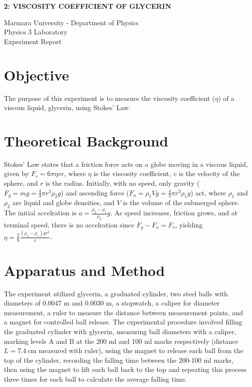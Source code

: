 \documentclass[12pt, a4paper]{article}
\begin{document}
\begin{center}
	\Large \textbf{2: VISCOSITY COEFFICIENT OF GLYCERIN}
	\vspace{0.5cm}
	    
	\normalsize Marmara University - Department of Physics \\
	Physics 3 Laboratory \\
	Experiment Report
	\vspace{0.5cm}
\end{center}

\section{Objective}
The purpose of this experiment is to measure the viscosity coefficient ($\eta$) of a viscous liquid, glycerin, using Stokes' Law.

\section{Theoretical Background}
Stokes' Law states that a friction force acts on a globe moving in a viscous liquid, given by $F_v = 6\pi\eta vr$, where $\eta$ is the viscosity coefficient, $v$ is the velocity of the sphere, and $r$ is the radius. Initially, with no speed, only gravity ($F_g = mg = \frac{4}{3}\pi r^3 \rho_2 g$) and ascending force ($F_a = \rho_1 V g = \frac{4}{3}\pi r^3 \rho_1 g$) act, where $\rho_1$ and $\rho_2$ are liquid and globe densities, and $V$ is the volume of the submerged sphere. The initial accelration is $a = \frac{\rho_2 - \rho_1}{\rho_2}g$. As speed increases, friction grows, and at terminal speed, there is no accelration since $F_g - F_a = F_v$, yielding $\eta = \frac{2}{9} \frac{(\rho_2 - \rho_1)g r^2}{v}$.

\section{Apparatus and Method}
The experiment utilized glycerin, a graduated cylinder, two steel balls with diameters of 0.0047 m and 0.0030 m, a stopwatch, a caliper for diameter measurement, a ruler to measure the distance between measurement points, and a magnet for controlled ball release. The experimental procedure involved filling the graduated cylinder with glycerin, measuring ball diameters with a caliper, marking levels A and B at the 200 ml and 100 ml marks respectively (distance $L = \SI{7.4}{\centi\metre}$ measured with ruler), using the magnet to release each ball from the top of the cylinder, recording the falling time between the 200-100 ml marks, then using the magnet to lift each ball back to the top and repeating this process three times for each ball to calculate the average falling time.
\end{document}
